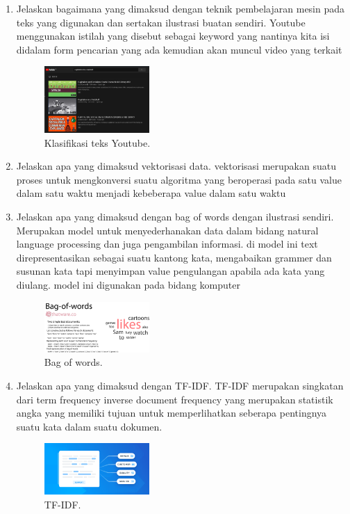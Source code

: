 \begin{enumerate}
	\item Jelaskan bagaimana yang dimaksud dengan teknik pembelajaran mesin pada teks yang digunakan dan sertakan ilustrasi buatan sendiri.
	\hfill\break
	Youtube menggunakan istilah yang disebut sebagai keyword yang nantinya kita isi didalam form pencarian yang ada kemudian akan muncul video yang terkait
	\begin{figure}[H]
	\centering
		\includegraphics[width=4cm]{figures/1174079/4/klasifikasiteks3.PNG}
		\caption{Klasifikasi teks Youtube.}
	\end{figure}

	\item Jelaskan apa yang dimaksud vektorisasi data.
	\hfill\break
	vektorisasi merupakan suatu proses untuk mengkonversi suatu algoritma yang beroperasi pada satu value dalam satu waktu menjadi kebeberapa value dalam satu waktu

	\item Jelaskan apa yang dimaksud dengan bag of words dengan ilustrasi sendiri.
	\hfill\break
	Merupakan model untuk menyederhanakan data dalam bidang natural language processing dan juga pengambilan informasi. di model ini text direpresentasikan sebagai suatu kantong kata, mengabaikan grammer dan susunan kata tapi menyimpan value pengulangan apabila ada kata yang diulang. model ini digunakan pada bidang komputer

	\begin{figure}[H]
	\centering
		\includegraphics[width=4cm]{figures/1174079/4/bagofword.png}
		\caption{Bag of words.}
	\end{figure}

	\item Jelaskan apa yang dimaksud dengan TF-IDF.
	\hfill\break
	TF-IDF merupakan singkatan dari term frequency inverse document frequency yang merupakan statistik angka yang memiliki tujuan untuk memperlihatkan seberapa pentingnya suatu kata dalam suatu dokumen.

	\begin{figure}[H]
	\centering
		\includegraphics[width=4cm]{figures/1174079/4/TFIDF.png}
		\caption{TF-IDF.}
	\end{figure}
\end{enumerate}


